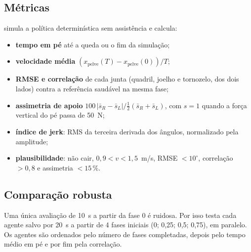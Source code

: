 \documentclass[11pt,a4paper]{article}
\begin{document}
\subsection{Métricas}
 simula a política determinística sem assistência e calcula:
\begin{itemize}
  \item \textbf{tempo em pé} até a queda ou o fim da simulação;
  \item \textbf{velocidade média} $(x_{\mathrm{pelve}}(T)-x_{\mathrm{pelve}}(0))/T$;
  \item \textbf{RMSE e correlação} de cada junta (quadril, joelho e tornozelo, dos dois lados) contra a referência saudável na mesma fase;
  \item \textbf{assimetria de apoio} $100\,|\bar s_R-\bar s_L|/\tfrac12(\bar s_R+\bar s_L)$, com $s=1$ quando a força vertical do pé passa de 50~N;
  \item \textbf{índice de jerk}: RMS da terceira derivada dos ângulos, normalizado pela amplitude;
  \item \textbf{plausibilidade}: não cair, $0{,}9<v<1{,}5$~m/s, RMSE $<10^\circ$, correlação $>0{,}8$ e assimetria $<15\,\%$.
\end{itemize}

\subsection{Comparação robusta}
Uma única avaliação de 10~s a partir da fase 0 é ruidosa. Por isso  testa cada agente
salvo por 20~s a partir de 4 fases iniciais (0; 0{,}25; 0{,}5; 0{,}75), em paralelo. Os agentes são ordenados
pelo número de fases completadas, depois pelo tempo médio em pé e por fim pela correlação.
\end{document}
